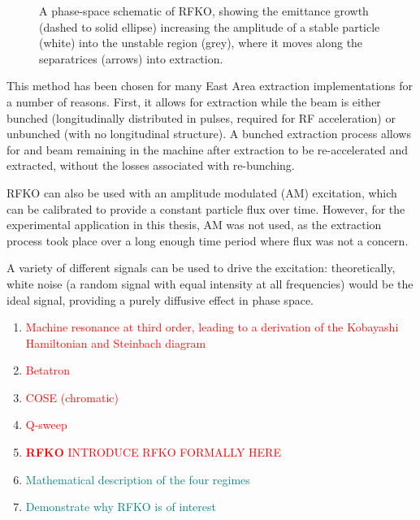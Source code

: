 \documentclass[11pt]{report}
\newcommand\todo[1]{\textcolor{red}{#1}}
\begin{document}
\begin{figure}
  \caption{A phase-space schematic of RFKO, showing the emittance growth (dashed to solid ellipse) increasing the amplitude of a stable particle (white) into the unstable region (grey), where it moves along the separatrices (arrows) into extraction.}\label{fig:rfko_phase_space}
\end{figure}

This method has been chosen for many East Area extraction implementations for a number of reasons. First, it allows for extraction while the beam is either bunched (longitudinally distributed in pulses, required for RF acceleration) or unbunched (with no longitudinal structure). A bunched extraction process allows for and beam remaining in the machine after extraction to be re-accelerated and extracted, without the losses associated with re-bunching.

RFKO can also be used with an amplitude modulated (AM) excitation, which can be calibrated to provide a constant particle flux over time. However, for the experimental application in this thesis, AM was not used, as the extraction process took place over a long enough time period where flux was not a concern.

A variety of different signals can be used to drive the excitation: theoretically, white noise (a random signal with equal intensity at all frequencies) would be the ideal signal, providing a purely diffusive effect in phase space. 

\begin{enumerate}
  \item \todo{Machine resonance at third order, leading to a derivation of the Kobayashi Hamiltonian and Steinbach diagram} \checkmark
  \item \todo{Betatron} \checkmark
  \item \todo{COSE (chromatic)}
  \item \todo{Q-sweep}
  \item \todo{\textbf{RFKO} INTRODUCE RFKO FORMALLY HERE}
  \item \textcolor{teal}{Mathematical description of the four regimes}
  \item \textcolor{teal}{Demonstrate why RFKO is of interest}
\end{enumerate}
\end{document}
